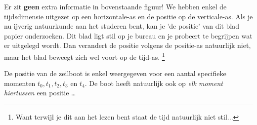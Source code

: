 \documentclass{ximera}
\begin{document}
Er zit \textbf{geen} extra informatie in bovenstaande figuur! 
We hebben enkel de tijdsdimensie uitgezet op een horizontale-as en de positie op de verticale-as. 
Als je nu ijverig natuurkunde aan het studeren bent, kan je 'de positie' van dit blad papier onderzoeken. 
Dit blad ligt stil op je bureau en je probeert te begrijpen wat er uitgelegd wordt. 
Dan verandert de positie volgens de positie-as natuurlijk niet, maar het blad beweegt zich wel voort op de tijd-as. \footnote{Want terwijl je dit aan het lezen bent staat de tijd natuurlijk niet stil...\footnotemark}

De positie van de zeilboot is enkel weergegeven voor een aantal specifieke momenten \(t_0, t_1, t_2, t_3 \text{ en } t_4\). 
De boot heeft natuurlijk ook op \textit{elk moment hiertussen} een positie \ldots

\end{document}
